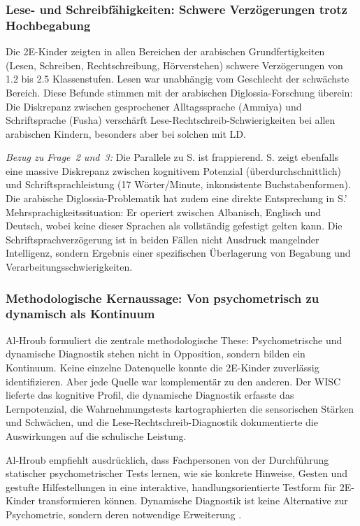 \documentclass[ngerman, a4paper]{article}
\begin{document}
\subsubsection*{Lese- und Schreibfähigkeiten: Schwere Verzögerungen trotz
  Hochbegabung}

Die 2E-Kinder zeigten in allen Bereichen der arabischen Grundfertigkeiten
(Lesen, Schreiben, Rechtschreibung, Hörverstehen) schwere Verzögerungen
von 1.2 bis 2.5 Klassenstufen. Lesen war unabhängig vom Geschlecht der
schwächste Bereich. Diese Befunde stimmen mit der arabischen
Diglossia-Forschung überein: Die Diskrepanz zwischen gesprochener
Alltagssprache (Ammiya) und Schriftsprache (Fusha) verschärft
Lese-Rechtschreib-Schwierigkeiten bei allen arabischen Kindern, besonders
aber bei solchen mit LD.

\textit{Bezug zu Frage~2 und~3:} Die Parallele zu S. ist frappierend. S.
zeigt ebenfalls eine massive Diskrepanz zwischen kognitivem Potenzial
(überdurchschnittlich) und Schriftsprachleistung (17 Wörter/Minute,
inkonsistente Buchstabenformen). Die arabische Diglossia-Problematik hat
zudem eine direkte Entsprechung in S.' Mehrsprachigkeitssituation: Er
operiert zwischen Albanisch, Englisch und Deutsch, wobei keine dieser
Sprachen als vollständig gefestigt gelten kann. Die
Schriftsprachverzögerung ist in beiden Fällen nicht Ausdruck mangelnder
Intelligenz, sondern Ergebnis einer spezifischen Überlagerung von Begabung
und Verarbeitungsschwierigkeiten.

\subsubsection*{Methodologische Kernaussage: Von psychometrisch zu
  dynamisch als Kontinuum}

Al-Hroub formuliert die zentrale methodologische These: Psychometrische
und dynamische Diagnostik stehen nicht in Opposition, sondern bilden ein
Kontinuum. Keine einzelne Datenquelle konnte die 2E-Kinder zuverlässig
identifizieren. Aber jede Quelle war komplementär zu den anderen. Der WISC
lieferte das kognitive Profil, die dynamische Diagnostik erfasste das
Lernpotenzial, die Wahrnehmungstests kartographierten die sensorischen
Stärken und Schwächen, und die Lese-Rechtschreib-Diagnostik dokumentierte
die Auswirkungen auf die schulische Leistung.

Al-Hroub empfiehlt ausdrücklich, dass Fachpersonen von der Durchführung
statischer psychometrischer Tests lernen, wie sie konkrete Hinweise, Gesten
und gestufte Hilfestellungen in eine interaktive, handlungsorientierte
Testform für 2E-Kinder transformieren können. Dynamische Diagnostik ist
keine Alternative zur Psychometrie, sondern deren notwendige Erweiterung
\parencite{alhroub2021utility}.
\end{document}
